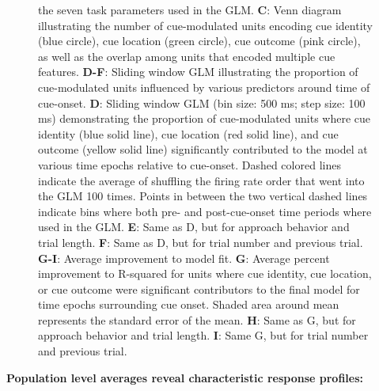 \documentclass[11pt]{article}
\newcommand{\bsf}[1]{\textbf{#1}}
\begin{document}
{\begin{figure}[h]
{the seven task parameters used in the GLM. \bsf{C}: Venn diagram illustrating the number of cue-modulated units encoding cue identity (blue circle), cue location (green circle), cue outcome (pink circle), as well as the overlap among units that encoded multiple cue features. \bsf{D-F}: Sliding window GLM illustrating the proportion of cue-modulated units influenced by various predictors around time of cue-onset. \bsf{D}: Sliding window GLM (bin size: 500 ms; step size: 100 ms) demonstrating the proportion of cue-modulated units where cue identity (blue solid line), cue location (red solid line), and cue outcome (yellow solid line) significantly contributed to the model at various time epochs relative to cue-onset. Dashed colored lines indicate the average of shuffling the firing rate order that went into the GLM 100 times. Points in between the two vertical dashed lines indicate bins where both pre- and post-cue-onset time periods where used in the GLM. \bsf{E}: Same as D, but for approach behavior and trial length. \bsf{F}: Same as D, but for trial number and previous trial. \bsf{G-I}: Average improvement to model fit. \bsf{G}: Average percent improvement to R-squared for units where cue identity, cue location, or cue outcome were significant contributors to the final model for time epochs surrounding cue onset. Shaded area around mean represents the standard error of the mean. \bsf{H}: Same as G, but for approach behavior and trial length. \bsf{I}: Same G, but for trial number and previous trial.}
\label{fig:GLM}
\end{figure}

{\bf Population level averages reveal characteristic response profiles:}

}
\end{document}
